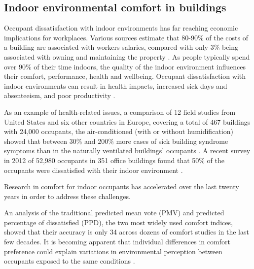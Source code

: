 \documentclass[]{interact}
\theoremstyle{plain}%
\theoremstyle{definition}
\theoremstyle{remark}
\begin{document}
\subsection{Indoor environmental comfort in buildings}
Occupant dissatisfaction with indoor environments has far reaching economic implications for workplaces. Various sources estimate that 80-90\% of the costs of a building are associated with workers salaries, compared with only 3\% being associated with owning and maintaining the property \citep{Creativeandproductiveworkplaces}. As people typically spend over 90\% of their time indoors, the quality of the indoor environment influences their comfort, performance, health and wellbeing. Occupant dissatisfaction with indoor environments can result in health impacts, increased sick days and absenteeism, and poor productivity \citep{MiltonDonaldK.P.MarkGlencross2000}.

As an example of health-related issues, a comparison of 12 field studies from United States and six other countries in Europe, covering a total of 467 buildings with 24,000 occupants, the air-conditioned (with or without humidification) showed that between 30\% and 200\% more cases of sick building syndrome symptoms than in the naturally ventilated buildings' occupants \citep{Evolvingopportunities, ventilationsystemtype}. A recent survey in 2012 of 52,980 occupants in 351 office buildings found that 50\% of the occupants were dissatisfied with their indoor environment \citep{Frontczak2012QuantitativeDesign}. 




Research in comfort for indoor occupants has accelerated over the last twenty years in order to address these challenges. 

An analysis of the traditional predicted mean vote (PMV) and predicted percentage of dissatisfied (PPD), the two most widely used comfort indices, showed that their accuracy is only 34%
across dozens of comfort studies in the last few decades. It is becoming apparent that individual differences in comfort preference could explain variations in environmental perception
between occupants exposed to the same conditions \cite{cheung2019analysis, livcina2018development}.
\end{document}
